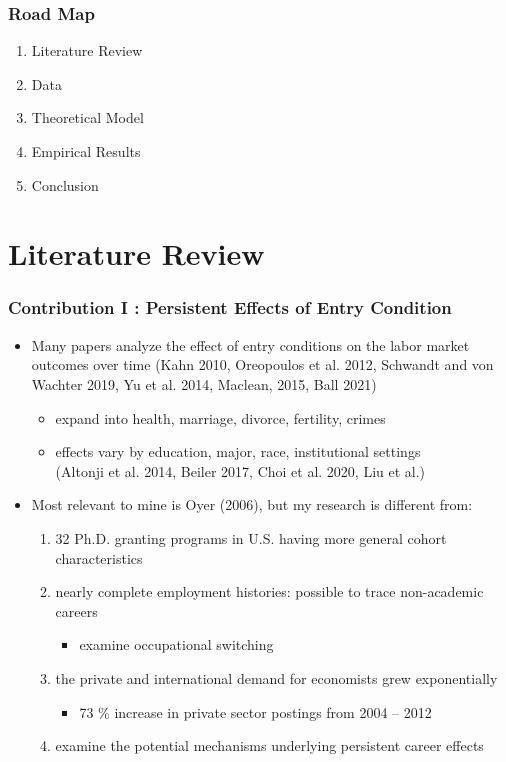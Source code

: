 \documentclass[10pt,svgnames,fragile]{beamer}
\begin{document}
\begin{frame}
	\frametitle{Road Map}
	\begin{enumerate}
		\item Literature Review
\vfill
		\item Data
\vfill
		\item Theoretical Model
\vfill
		\item Empirical Results
\vfill
		\item Conclusion
\vfill
	\end{enumerate}
\end{frame}



{
\AtBeginSection{}
\section{Literature Review}
\begin{frame}
	\frametitle{Contribution I : Persistent Effects of Entry Condition} 
	\begin{itemize}
		\item Many papers analyze the effect of entry conditions on the labor market outcomes over time (Kahn 2010, Oreopoulos et al. 2012, Schwandt and von Wachter 2019, Yu et al. 2014,  Maclean, 2015, Ball 2021)
		\begin{itemize}
\vfill
			\item expand into health, marriage, divorce, fertility, crimes
			\vspace{2 mm}
			\item effects vary by education, major, race, institutional settings \\(Altonji et al. 2014, Beiler 2017, Choi et al. 2020, Liu et al.)
		\end{itemize}
\vfill
		\item Most relevant to mine is Oyer (2006), but my research is different from:
		\vfill
		\begin{enumerate}
			\item 32 Ph.D. granting programs in U.S. having more general cohort characteristics
			\vspace{2 mm}
			\item nearly complete employment histories: possible to trace non-academic careers
			\begin{itemize}
				\item examine occupational switching
			\end{itemize}
		\vspace{2 mm}
			\item the private and international demand for economists grew exponentially 
			\begin{itemize}
				\item 73 \% increase in private sector postings from 2004 -- 2012
			\end{itemize}
		\vspace{2 mm}
			\item examine the potential mechanisms underlying persistent career effects
		\end{enumerate}
\vfill
	\end{itemize}
\end{frame}





}
\end{document}
